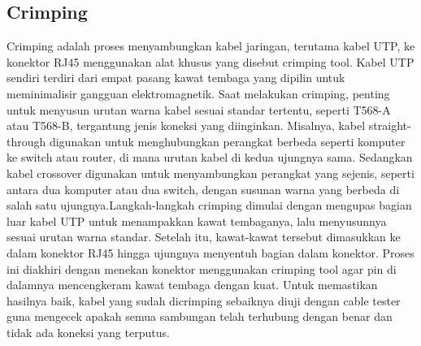 \subsection*{Crimping}
Crimping adalah proses menyambungkan kabel jaringan, terutama kabel UTP, ke konektor RJ45 menggunakan alat khusus yang disebut crimping tool. Kabel UTP sendiri terdiri dari empat pasang kawat tembaga yang dipilin untuk meminimalisir gangguan elektromagnetik. Saat melakukan crimping, penting untuk menyusun urutan warna kabel sesuai standar tertentu, seperti T568-A atau T568-B, tergantung jenis koneksi yang diinginkan. Misalnya, kabel straight-through digunakan untuk menghubungkan perangkat berbeda seperti komputer ke switch atau router, di mana urutan kabel di kedua ujungnya sama. Sedangkan kabel crossover digunakan untuk menyambungkan perangkat yang sejenis, seperti antara dua komputer atau dua switch, dengan susunan warna yang berbeda di salah satu ujungnya.Langkah-langkah crimping dimulai dengan mengupas bagian luar kabel UTP untuk menampakkan kawat tembaganya, lalu menyusunnya sesuai urutan warna standar. Setelah itu, kawat-kawat tersebut dimasukkan ke dalam konektor RJ45 hingga ujungnya menyentuh bagian dalam konektor. Proses ini diakhiri dengan menekan konektor menggunakan crimping tool agar pin di dalamnya mencengkeram kawat tembaga dengan kuat. Untuk memastikan hasilnya baik, kabel yang sudah dicrimping sebaiknya diuji dengan cable tester guna mengecek apakah semua sambungan telah terhubung dengan benar dan tidak ada koneksi yang terputus.
